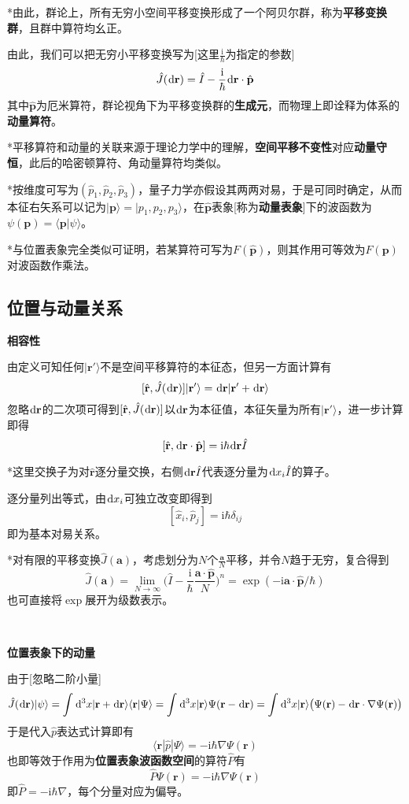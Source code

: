 \documentclass[a4paper,UTF8,fontset=windows]{ctexart}
\newcommand*{\dr}{\hspace{0.07em}\mathrm{d}}
\newcommand*{\ir}{\mathrm{i}}
\newcommand*{\ket}[1]{|#1\rangle}
\newcommand*{\bk}[2]{\langle#1|#2\rangle}
\newcommand*{\blk}[3]{\langle#1|#2|#3\rangle}
\newcommand*{\br}{\mathbf{r}}
\newcommand*{\bp}{\mathbf{p}}
\begin{document}
*由此，群论上，所有无穷小空间平移变换形成了一个阿贝尔群，称为\textbf{平移变换群}，且群中算符均幺正。

由此，我们可以把无穷小平移变换写为[这里$\frac{\ir}{\hbar}$为指定的参数]
$$\hat{J}(\dr\br)=\hat{I}-\frac{\ir}{\hbar}\dr\br\cdot\hat{\bp}$$
其中$\hat{\bp}$为厄米算符，群论视角下为平移变换群的\textbf{生成元}，而物理上即诠释为体系的\textbf{动量算符}。

*平移算符和动量的关联来源于理论力学中的理解，\textbf{空间平移不变性}对应\textbf{动量守恒}，此后的哈密顿算符、角动量算符均类似。

*按维度可写为$(\hat{p}_1,\hat{p}_2,\hat{p}_3)$，量子力学亦假设其两两对易，于是可同时确定，从而本征右矢系可以记为$\ket{\bp}=\ket{p_1,p_2,p_3}$，在$\hat{\bp}$表象[称为\textbf{动量表象}]下的波函数为$\psi(\bp)=\bk{\bp}{\psi}$。

*与位置表象完全类似可证明，若某算符可写为$F(\hat{\bp})$，则其作用可等效为$F(\bp)$对波函数作乘法。

\subsection{位置与动量关系}
\textbf{相容性}

由定义可知任何$\ket{\br'}$不是空间平移算符的本征态，但另一方面计算有
$$[\hat{\br},\hat{J}(\dr\br)]\ket{\br'}=\dr\br\ket{\br'+\dr\br}$$
忽略$\dr\br$的二次项可得到$[\hat{\br},\hat{J}(\dr\br)]$以$\dr\br$为本征值，本征矢量为所有$\ket{\br'}$，进一步计算即得
$$[\hat{\br},\dr\br\cdot\hat{\bp}]=\ir\hbar\dr\br\hat{I}$$

*这里交换子为对$\hat{\br}$逐分量交换，右侧$\dr\br\hat{I}$代表逐分量为$\dr x_i\hat{I}$的算子。

逐分量列出等式，由$\dr x_i$可独立改变即得到
$$[\hat{x}_i,\hat{p}_j]=\ir\hbar\delta_{ij}$$
即为基本对易关系。

*对有限的平移变换$\hat{J}(\mathbf{a})$，考虑划分为$N$个$\frac{\mathbf{a}}{N}$平移，并令$N$趋于无穷，复合得到
$$\hat{J}(\mathbf{a})=\lim_{N\to\infty}\bigg(\hat{I}-\frac{\ir}{\hbar}\frac{\mathbf{a}\cdot\hat{\bp}}{N}\bigg)^n=\exp(-\ir\mathbf{a}\cdot\hat{\bp}/\hbar)$$
也可直接将$\exp$展开为级数表示。

\

\textbf{位置表象下的动量}

由于[忽略二阶小量]
$$\hat{J}(\dr\br)\ket{\psi}=\int\dr^3x\ket{\br+\dr\br}\bk{\br}{\Psi}=\int\dr^3x\ket{\br}\Psi(\br-\dr\br)=\int\dr^3x\ket{\br}\big(\Psi(\br)-\dr\br\cdot\nabla\Psi(\br)\big)$$
于是代入$\hat{p}$表达式计算即有
$$\blk{\br}{\hat{p}}{\Psi}=-\ir\hbar\nabla\Psi(\br)$$
也即等效于作用为\textbf{位置表象波函数空间}的算符$\hat{P}$有
$$\hat{P}\Psi(\br)=-\ir\hbar\nabla\Psi(\br)$$
即$\hat{P}=-\ir\hbar\nabla$，每个分量对应为偏导。
\end{document}
